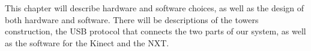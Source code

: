 This chapter will describe hardware and software choices, as well as the design of both hardware and software.
There will be descriptions of the towers construction, the USB protocol that connects the two parts of our system, as well as the software for the Kinect and the NXT.